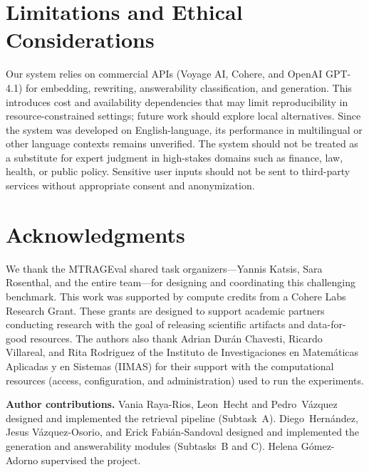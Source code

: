 \documentclass[11pt]{article}
\begin{document}
\section*{Limitations and Ethical Considerations}

Our system relies on commercial APIs (Voyage AI, Cohere, and OpenAI GPT-4.1) for embedding, rewriting, answerability classification, and generation. This introduces cost and availability dependencies that may limit reproducibility in resource-constrained settings; future work should explore local alternatives. Since the system was developed on English-language, its performance in multilingual or other language contexts remains unverified.
The system should not be treated as a substitute for expert judgment in high-stakes domains such as finance, law, health, or public policy. Sensitive user inputs should not be sent to third-party services without appropriate consent and anonymization.

\section*{Acknowledgments}

We thank the MTRAGEval shared task organizers---Yannis Katsis, Sara Rosenthal, and the entire team---for designing and coordinating this challenging benchmark.
This work was supported by compute credits from a Cohere Labs Research Grant. These grants are designed to support academic partners conducting research with the goal of releasing scientific artifacts and data-for-good resources.
The authors also thank Adrian Durán Chavesti, Ricardo Villareal, and Rita Rodriguez of the Instituto de Investigaciones en Matemáticas Aplicadas y en Sistemas (IIMAS) for their support with the computational resources (access, configuration, and administration) used to run the experiments.

\textbf{Author contributions.} Vania Raya-Rios, Leon~Hecht and Pedro~V\'azquez designed and implemented the retrieval pipeline (Subtask~A). Diego~Hern\'andez, Jesus Vázquez-Osorio, and Erick Fabián-Sandoval designed and implemented the generation and answerability modules (Subtasks~B and C). Helena G\'omez-Adorno supervised the project.
\end{document}
